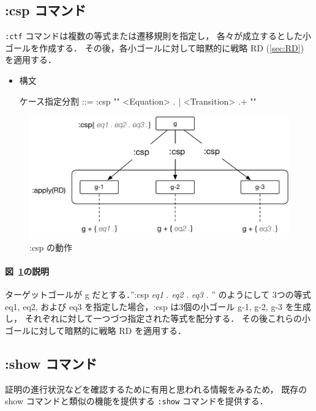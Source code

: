 \documentclass[a4paper,oneside,10pt,here]{memoir}
\newenvironment{vvtm}%
{\parskip=0pt\lineskip=0pt\begin{center}\begin{minipage}{0.8\textwidth}\begin{snugshade}}%
  {\end{snugshade}\end{minipage}\end{center}}
\begin{document}
\subsection{:csp コマンド}\label{sec:csp}
\texttt{:ctf} コマンドは複数の等式または遷移規則を指定し，
各々が成立するとした小ゴールを作成する．
その後，各小ゴールに対して暗黙的に戦略 RD (\ref{sec:RD}) を適用する．

\begin{itemize}
\item 構文
  \begin{vvtm}
    \begin{simplev}
      ケース指定分割 ::= :csp "{" { <Equation> . | <Transition> .}+ "}"
    \end{simplev}
  \end{vvtm}
\end{itemize}

\begin{figure}[hbt]
  \centering
  \includegraphics[scale=0.6]{csp.pdf}
  \caption{:csp の動作}
  \label{fig:csp}
\end{figure}

\paragraph{図~\ref{fig:csp}の説明}
ターゲットゴールが g だとする．”:csp { \textit{eq1} . \textit{eq2} . \textit{eq3} . }” のようにして
3つの等式 eq1, eq2, および eq3 を指定した場合，:csp は3個の小ゴール g-1, g-2, g-3 を生成し，
それぞれに対して一つづつ指定された等式を配分する．
その後これらの小ゴールに対して暗黙的に戦略 RD を適用する．

\subsection{:show コマンド}
証明の進行状況などを確認するために有用と思われる情報をみるため，
既存の show コマンドと類似の機能を提供する \texttt{:show} コマンドを提供する．
\end{document}
